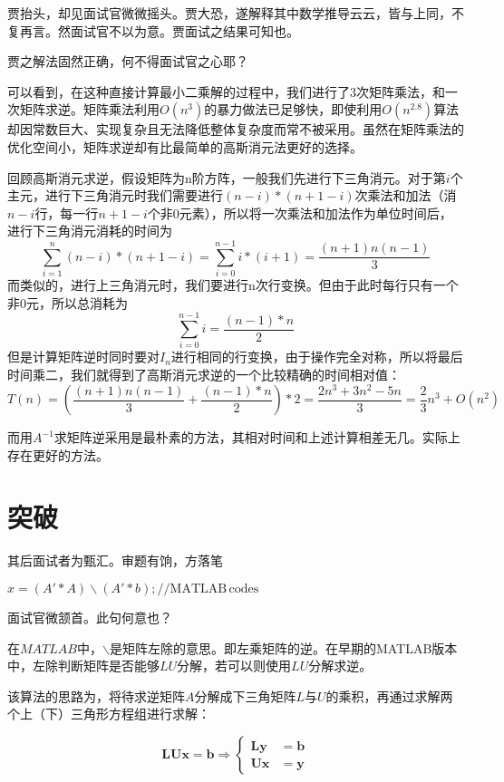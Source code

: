 贾抬头，却见面试官微微摇头。贾大恐，遂解释其中数学推导云云，皆与上同，不复再言。然面试官不以为意。贾面试之结果可知也。

贾之解法固然正确，何不得面试官之心耶？

可以看到，在这种直接计算最小二乘解的过程中，我们进行了3次矩阵乘法，和一次矩阵求逆。矩阵乘法利用$O(n^3)$的暴力做法已足够快，即使利用$O(n^{2.8})$算法却因常数巨大、实现复杂且无法降低整体复杂度而常不被采用。虽然在矩阵乘法的优化空间小，矩阵求逆却有比最简单的高斯消元法更好的选择。

回顾高斯消元求逆，假设矩阵为n阶方阵，一般我们先进行下三角消元。对于第$i$个主元，进行下三角消元时我们需要进行$(n-i)*(n+1-i)$次乘法和加法（消$n-i$行，每一行$n+1-i$个非0元素），所以将一次乘法和加法作为单位时间后，进行下三角消元消耗的时间为
\[\sum_{i=1}^{n}(n-i)*(n+1-i)=\sum_{i=0}^{n-1}i*(i+1)=\frac{(n+1)n(n-1)}{3}\]
而类似的，进行上三角消元时，我们要进行n次行变换。但由于此时每行只有一个非0元，所以总消耗为
\[\sum_{i=0}^{n-1}i=\frac{(n-1)*n}{2}\]
但是计算矩阵逆时同时要对$I_n$进行相同的行变换，由于操作完全对称，所以将最后时间乘二，我们就得到了高斯消元求逆的一个比较精确的时间相对值：
\[T(n)=(\frac{(n+1)n(n-1)}{3}+\frac{(n-1)*n}{2})*2=\frac{2n^3+3n^2-5n}{3}=\frac{2}{3}n^3+O(n^2)\]

而用$A^{-1}$求矩阵逆采用是最朴素的方法，其相对时间和上述计算相差无几。实际上存在更好的方法。

\section{突破}
其后面试者为甄汇。审题有饷，方落笔
\begin{solution}
	\hspace{1cm}$x=(A'*A)\backslash (A'*b); \mathrm{//MATLAB\, codes}$
\end{solution}

面试官微颔首。此句何意也？

在$MATLAB$中，$\backslash$是矩阵左除的意思。即左乘矩阵的逆。在早期的MATLAB版本中，左除判断矩阵是否能够$LU$分解，若可以则使用$LU$分解求逆。

该算法的思路为，将待求逆矩阵$A$分解成下三角矩阵$L$与$U$的乘积，再通过求解两个上（下）三角形方程组进行求解：

\[\boldsymbol L\boldsymbol U\boldsymbol x=\boldsymbol b\Rightarrow\begin{cases}\boldsymbol L\boldsymbol y&=\boldsymbol b \\ \boldsymbol U\boldsymbol x&=\boldsymbol y\end{cases}\]

